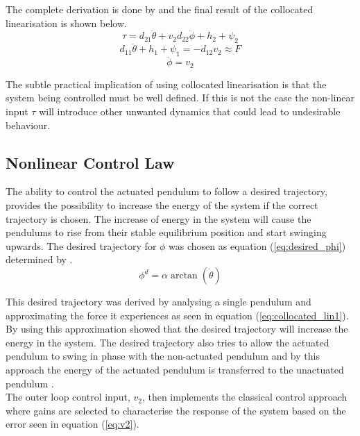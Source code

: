  The complete derivation is done by \citeauthor{spong_swingup} and the final result of the collocated linearisation is shown below.
\begin{equation} \label{eq:collocated_lin3}
\tau = d_{21}\ddot{\theta} + v_{2}d_{22}\ddot{\phi} + h_{2} + \psi_{2}
\end{equation}
\begin{equation} \label{eq:collocated_lin1}
d_{11}\ddot{\theta} + h_{1} + \psi_{1} = -d_{12}v_{2} \approx F
\end{equation}
\begin{equation} \label{eq:collocated_lin2}
\ddot{\phi} = v_{2}
\end{equation}

The subtle practical implication of using collocated linearisation is that the system being controlled must be well defined. If this is not the case the non-linear input $\tau$ will introduce other unwanted dynamics that could lead to undesirable behaviour.

\subsection{Nonlinear Control Law}

The ability to control the actuated pendulum to follow a desired trajectory, provides the possibility to increase the energy of the system if the correct trajectory is chosen. The increase of energy in the system will cause the pendulums to rise from their stable equilibrium position and start swinging upwards. The desired trajectory for ${\phi}$ was chosen as equation (\ref{eq:desired_phi}) determined by \citet{spong_swingup}.
\begin{equation} \label{eq:desired_phi}
\phi^{d} =  \alpha \arctan(\dot{\theta})
\end{equation}

This desired trajectory was derived by analysing a single pendulum and approximating the force it experiences as seen in equation (\ref{eq:collocated_lin1}). By using this approximation \citeauthor{spong_swingup} showed that the desired trajectory will increase the energy in the system. The desired trajectory also tries to allow the actuated pendulum to swing in phase with the non-actuated pendulum and by this approach the energy of the actuated pendulum is transferred to the unactuated pendulum \citep{spong_swingup}.\\

The outer loop control input, $v_{2}$, then implements the classical control approach where gains are selected to characterise the response of the system based on the error seen in equation (\ref{eq:v2}). 

